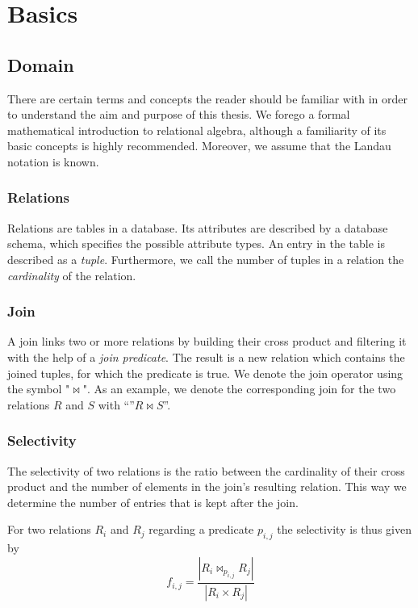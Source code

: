 \section{Basics}
\label{sec:basics}

\subsection{Domain}
There are certain terms and concepts the reader should be familiar with in order to understand the aim and purpose of this thesis. 
We forego a formal mathematical introduction to relational algebra, although a familiarity of its basic concepts is highly recommended. 
Moreover, we assume that the Landau notation is known.

\subsubsection{Relations}
Relations are tables in a database. 
Its attributes are described by a database schema, which specifies the possible attribute types.
An entry in the table is described as a \textit{tuple}. Furthermore, we call the number of tuples in a relation the \textit{cardinality} of the relation.

\subsubsection{Join}
A join links two or more relations by building their cross product and filtering it with the help of a \textit{join predicate}. 
The result is a new relation which contains the joined tuples, for which the predicate is true. We denote the join operator using the symbol "$\Join$". 
As an example, we denote the corresponding join for the two relations $R$ and $S$ with ``''$R \Join S$''.

\subsubsection{Selectivity}
The selectivity of two relations is the ratio between the cardinality of their cross product and the number of elements in the join's resulting relation. 
This way we determine the number of entries that is kept after the join.

For two relations $R_i$ and $R_j$ regarding a predicate $p_{i,j}$ the selectivity is thus given by 
\begin{equation}
f_{i,j} = \frac{|R_i\Join_{p_{i,j}}R_j|}{|R_i \times R_j|}	
\end{equation}

